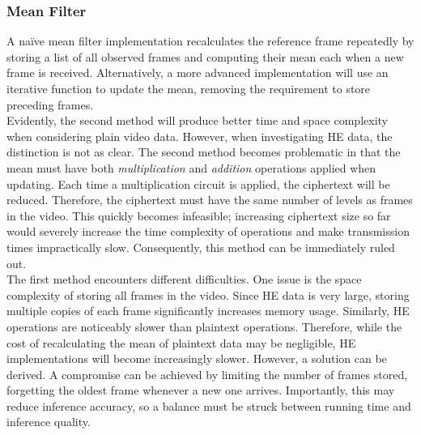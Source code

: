 \subsubsection{Mean Filter}
\indent \indent
A na\"ive mean filter implementation recalculates the reference frame repeatedly by storing a list of all observed frames and computing their mean each when a new frame is received. Alternatively, a more advanced implementation will use an iterative function to update the mean, removing the requirement to store preceding frames.
\smallskip \\ \indent
Evidently, the second method will produce better time and space complexity when considering plain video data. However, when investigating HE data, the distinction is not as clear. The second method becomes problematic in that the mean must have both \textit{multiplication} and \textit{addition} operations applied when updating. Each time a multiplication circuit is applied, the ciphertext will be reduced. Therefore, the ciphertext must have the same number of levels as frames in the video. This quickly becomes infeasible; increasing ciphertext size so far would severely increase the time complexity of operations and make transmission times impractically slow. Consequently, this method can be immediately ruled out.
\smallskip \\ \indent
The first method encounters different difficulties. One issue is the space complexity of storing all frames in the video. Since HE data is very large, storing multiple copies of each frame significantly increases memory usage. Similarly, HE operations are noticeably slower than plaintext operations. Therefore, while the cost of recalculating the mean of plaintext data may be negligible, HE implementations will become increasingly slower. However, a solution can be derived. A compromise can be achieved by limiting the number of frames stored, forgetting the oldest frame whenever a new one arrives. Importantly, this may reduce inference accuracy, so a balance must be struck between running time and inference quality.
